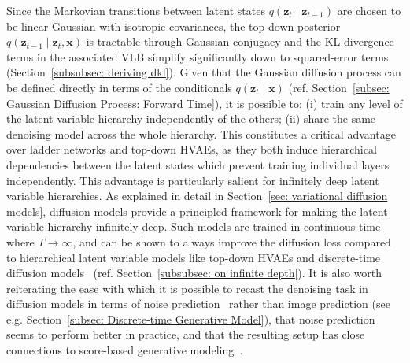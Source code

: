 Since the Markovian transitions between latent states $q(\mathbf{z}_t \mid \mathbf{z}_{t-1})$ are chosen to be linear Gaussian with isotropic covariances, the top-down posterior $q(\mathbf{z}_{t-1} \mid \mathbf{z}_{t}, \mathbf{x})$ is tractable through Gaussian conjugacy and the KL divergence terms in the associated VLB simplify significantly down to squared-error terms (Section~\ref{subsubsec: deriving dkl}). Given that the Gaussian diffusion process can be defined directly in terms of the conditionals $q(\mathbf{z}_t \mid \mathbf{x})$ (ref. Section~\ref{subsec: Gaussian Diffusion Process: Forward Time}), it is possible to: (i) train any level of the latent variable hierarchy independently of the others; (ii) share the same denoising model across the whole hierarchy. This constitutes a critical advantage over ladder networks and top-down HVAEs, as they both induce hierarchical dependencies between the latent states which prevent training individual layers independently. This advantage is particularly salient for infinitely deep latent variable hierarchies. As explained in detail in Section~\ref{sec: variational diffusion models}, diffusion models provide a principled framework for making the latent variable hierarchy infinitely deep. Such models are trained in continuous-time where $T \to \infty$, and can be shown to always improve the diffusion loss compared to hierarchical latent variable models like top-down HVAEs and discrete-time diffusion models~\citep{kingma2021variational} (ref. Section~\ref{subsubsec: on infinite depth}). It is also worth reiterating the ease with which it is possible to recast the denoising task in diffusion models in terms of noise prediction~\citep{ho2020denoising} rather than image prediction (see e.g. Section~\ref{subsec: Discrete-time Generative Model}), that noise prediction seems to perform better in practice, and that the resulting setup has close connections to score-based generative modeling~\citep{hyvarinen2005estimation,vincent2011connection,song2019generative,song2021scorebased}.

